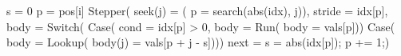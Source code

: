 \begin{juliacode}
s = 0
p = pos[i]
Stepper(
  seek(j) = (
    p = search(abs(idx), j)),
  stride = idx[p],
  body = Switch(
    Case(
      cond = idx[p] > 0,
      body = Run(
        body = vals[p]))
    Case(
      body = Lookup(
        body(j) = vals[p + j - s])))
  next = s = abs(idx[p]); p += 1;)
\end{juliacode}